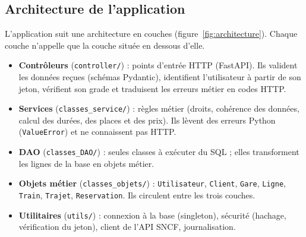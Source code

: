 \documentclass[11pt,a4paper]{article}
\newcommand{\code}[1]{\texttt{#1}}
\begin{document}
\subsection{Architecture de l'application}

L'application suit une architecture en couches (figure~\ref{fig:architecture}). Chaque couche
n'appelle que la couche située en dessous d'elle.

\begin{itemize}[itemsep=1pt]
  \item \textbf{Contrôleurs} (\code{controller/}) : points d'entrée HTTP (FastAPI). Ils valident les
        données reçues (schémas Pydantic), identifient l'utilisateur à partir de son jeton,
        vérifient son grade et traduisent les erreurs métier en codes HTTP.
  \item \textbf{Services} (\code{classes\_service/}) : règles métier (droits, cohérence des
        données, calcul des durées, des places et des prix). Ils lèvent des erreurs Python
        (\code{ValueError}) et ne connaissent pas HTTP.
  \item \textbf{DAO} (\code{classes\_DAO/}) : seules classes à exécuter du SQL ; elles transforment
        les lignes de la base en objets métier.
  \item \textbf{Objets métier} (\code{classes\_objets/}) : \code{Utilisateur}, \code{Client},
        \code{Gare}, \code{Ligne}, \code{Train}, \code{Trajet}, \code{Reservation}. Ils circulent
        entre les trois couches.
  \item \textbf{Utilitaires} (\code{utils/}) : connexion à la base (singleton), sécurité (hachage,
        vérification du jeton), client de l'API SNCF, journalisation.
\end{itemize}
\end{document}

